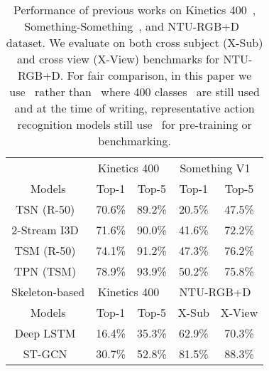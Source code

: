 \documentclass[10pt,twocolumn,letterpaper]{article}
\begin{document}
\setlength{\tabcolsep}{4pt}
\begin{table}[t]
\begin{center}
        \begin{tabular}{|c|c|c|c|c|}
            \hline
                   & \multicolumn{2}{|c|}{Kinetics 400~\cite{kinetics400}}
                   & \multicolumn{2}{|c|}{Something V1~\cite{goyal2017something}}\\ 
            Models & Top-1 &  Top-5 & Top-1 & Top-5  \\ 
            \hline 
            TSN (R-50)~\cite{TSN}   & 70.6\% & 89.2\% & 20.5\% & 47.5\% \\
            2-Stream I3D~\cite{i3d} & 71.6\% & 90.0\% & 41.6\% & 72.2\% \\
            TSM (R-50)~\cite{TSM}   & 74.1\% & 91.2\% & 47.3\% & 76.2\% \\
            TPN (TSM)~\cite{TPN}    & 78.9\% & 93.9\% & 50.2\% & 75.8\% \\
            \hline
            \hline Skeleton-based
                   & \multicolumn{2}{|c|}{Kinetics 400~\cite{kinetics400}}
                   & \multicolumn{2}{|c|}{NTU-RGB+D~\cite{nturgbd}}\\ 
            Models & Top-1 &  Top-5 & X-Sub & X-View  \\ 
            \hline
            Deep LSTM~\cite{nturgbd} & 16.4\% & 35.3\% & 62.9\% & 70.3\% \\
            ST-GCN~\cite{stgcn}      & 30.7\% & 52.8\% & 81.5\% & 88.3\% \\
            \hline
        \end{tabular}
\end{center}
\caption{Performance of previous works on Kinetics 400~\cite{kinetics400}, Something-Something~\cite{goyal2017something}, and NTU-RGB+D~\cite{nturgbd} dataset.
We evaluate on both cross subject (X-Sub) and cross view (X-View) benchmarks for NTU-RGB+D.
For fair comparison, in this paper we use~\cite{kinetics400} rather than~\cite{kinetics700}  where 400 classes~\cite{kinetics400} are still used and at the time of writing, representative action recognition models still use~\cite{kinetics400} for pre-training or benchmarking.   
\vspace{-1em}
\label{table:action_recognition_models}
}
\end{table}
\end{document}
